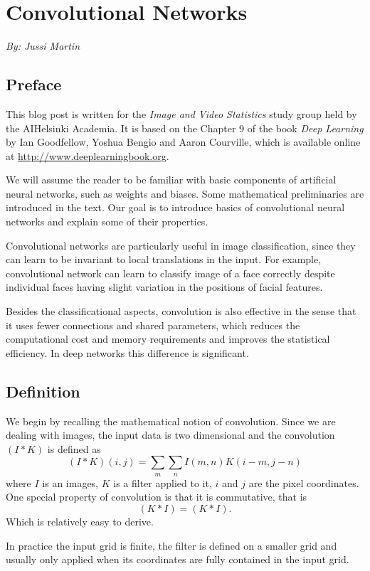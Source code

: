 \documentclass[]{article}
\begin{document}
\section{Convolutional Networks}
\begin{center}
  \emph{By: Jussi Martin}
\end{center}
\subsection{Preface}
This blog post is written for the \emph{Image and Video Statistics} study group
held by the AIHelsinki Academia. It is based on the Chapter 9 of the book
\emph{Deep Learning} by Ian Goodfellow, Yoshua Bengio and Aaron Courville, which
is available online at \url{http://www.deeplearningbook.org}.

We will assume the reader to be familiar with basic components of artificial
neural networks, such as weights and biases. Some mathematical preliminaries are
introduced in the text. Our goal is to introduce basics of convolutional neural
networks and explain some of their properties.

Convolutional networks are particularly useful in image classification, since
they can learn to be invariant to local translations in the input. For example,
convolutional network can learn to classify image of a face correctly despite
individual faces having slight variation in the positions of facial features.

Besides the classificational aspects, convolution is also effective in the sense
that it uses fewer connections and shared parameters, which reduces the
computational cost and memory requirements and improves the statistical efficiency.
In deep networks this difference is significant.

\subsection{Definition}
We begin by recalling the mathematical notion of convolution.
Since we are dealing with images, the input data is two dimensional and the convolution
$(I * K)$ is defined as
\[
(I * K)(i, j) = \sum_m \sum_n I(m , n) K(i - m, j - n)
\]
where $I$ is an images, $K$ is a filter applied to it, $i$ and $j$ are the
pixel coordinates. One special property of convolution is that it is commutative, that is
\[
 (K * I) = (K * I).
\]
Which is relatively easy to derive.

In practice the input grid is finite, the filter is defined on a smaller grid and
usually only applied when its coordinates are fully contained in the input grid.
\end{document}
